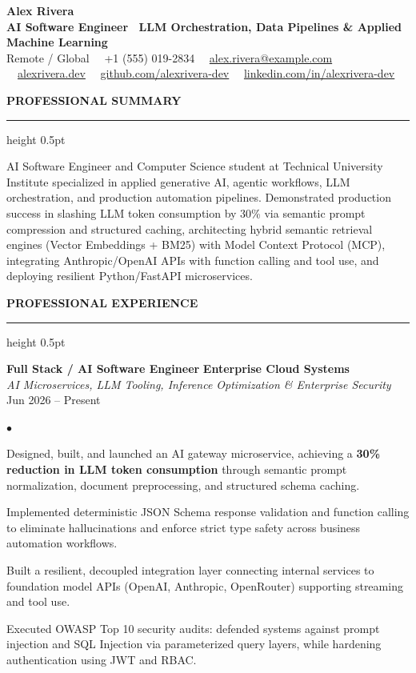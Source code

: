 \documentclass[10pt,letterpaper]{article}
\newcommand{\resumesection}[1]{%
  \vspace{2pt}%
  {\color{primary}\normalsize\bfseries\MakeUppercase{#1}}%
  \vspace{1pt}\hrule height 0.5pt\vspace{2pt}%
}
\renewenvironment{itemize}{%
  \begin{list}{\color{primary}$\bullet$}{%
    \setlength{\leftmargin}{1.1em}%
    \setlength{\itemsep}{0.5pt}%
    \setlength{\topsep}{1pt}%
    \setlength{\parsep}{0pt}%
    \setlength{\partopsep}{0pt}%
  }%
}{%
  \end{list}%
}
\begin{document}
\color{textdark}

\begin{center}
    {\LARGE \textbf{\color{primary} Alex Rivera}} \\ \vspace{1.5pt}
    {\large \textbf{AI Software Engineer \textbar\ LLM Orchestration, Data Pipelines \& Applied Machine Learning}} \\ \vspace{2pt}
    {\small
        Remote / Global \ \textbullet \
        +1 (555) 019-2834 \ \textbullet \
        \href{mailto:alex.rivera@example.com}{alex.rivera@example.com} \ \textbullet \
        \href{https://alexrivera.dev}{alexrivera.dev} \ \textbullet \
        \href{https://github.com/alexrivera-dev}{github.com/alexrivera-dev} \ \textbullet \
        \href{https://linkedin.com/in/alexrivera-dev}{linkedin.com/in/alexrivera-dev}
    }
\end{center}

\vspace{-6pt}

\resumesection{Professional Summary}
{\small AI Software Engineer and Computer Science student at Technical University Institute specialized in applied generative AI, agentic workflows, LLM orchestration, and production automation pipelines. Demonstrated production success in slashing LLM token consumption by 30\% via semantic prompt compression and structured caching, architecting hybrid semantic retrieval engines (Vector Embeddings + BM25) with Model Context Protocol (MCP), integrating Anthropic/OpenAI APIs with function calling and tool use, and deploying resilient Python/FastAPI microservices.}

\resumesection{Professional Experience}

\textbf{Full Stack / AI Software Engineer} \hfill \textbf{Enterprise Cloud Systems} \\
\textit{AI Microservices, LLM Tooling, Inference Optimization \& Enterprise Security} \hfill Jun 2026 -- Present
\begin{itemize}
    \item Designed, built, and launched an AI gateway microservice, achieving a \textbf{30\% reduction in LLM token consumption} through semantic prompt normalization, document preprocessing, and structured schema caching.
    \item Implemented deterministic JSON Schema response validation and function calling to eliminate hallucinations and enforce strict type safety across business automation workflows.
    \item Built a resilient, decoupled integration layer connecting internal services to foundation model APIs (OpenAI, Anthropic, OpenRouter) supporting streaming and tool use.
    \item Executed OWASP Top 10 security audits: defended systems against prompt injection and SQL Injection via parameterized query layers, while hardening authentication using JWT and RBAC.
\end{itemize}
\end{document}
